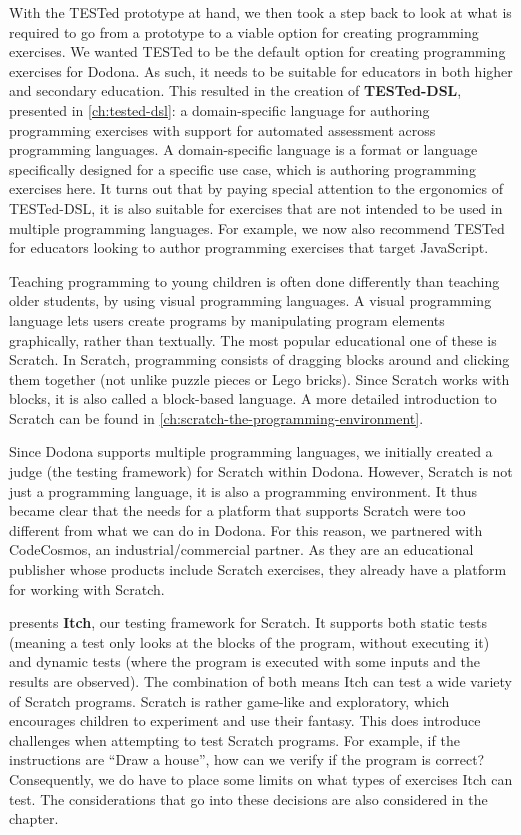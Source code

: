 \documentclass[main]{subfiles}
\begin{document}
With the TESTed prototype at hand, we then took a step back to look at what is required to go from a prototype to a viable option for creating programming exercises.
We wanted TESTed to be the default option for creating programming exercises for Dodona.
As such, it needs to be suitable for educators in both higher and secondary education.
This resulted in the creation of \textbf{TESTed-DSL}, presented in \cref{ch:tested-dsl}: a domain-specific language for authoring programming exercises with support for automated assessment across programming languages.
A domain-specific language is a format or language specifically designed for a specific use case, which is authoring programming exercises here.
It turns out that by paying special attention to the ergonomics of TESTed-DSL, it is also suitable for exercises that are not intended to be used in multiple programming languages.
For example, we now also recommend TESTed for educators looking to author programming exercises that target JavaScript.

Teaching programming to young children is often done differently than teaching older students, by using visual programming languages.
A visual programming language lets users create programs by manipulating program elements graphically, rather than textually.
The most popular educational one of these is Scratch.
In Scratch, programming consists of dragging blocks around and clicking them together (not unlike puzzle pieces or Lego bricks).
Since Scratch works with blocks, it is also called a block-based language.
A more detailed introduction to Scratch can be found in \cref{ch:scratch-the-programming-environment}.

Since Dodona supports multiple programming languages, we initially created a judge (the testing framework) for Scratch within Dodona.
However, Scratch is not just a programming language, it is also a programming environment.
It thus became clear that the needs for a platform that supports Scratch were too different from what we can do in Dodona.
For this reason, we partnered with CodeCosmos, an industrial/commercial partner.
As they are an educational publisher whose products include Scratch exercises, they already have a platform for working with Scratch.

 presents \textbf{Itch}, our testing framework for Scratch.
It supports both static tests (meaning a test only looks at the blocks of the program, without executing it) and dynamic tests (where the program is executed with some inputs and the results are observed).
The combination of both means Itch can test a wide variety of Scratch programs.
Scratch is rather game-like and exploratory, which encourages children to experiment and use their fantasy.
This does introduce challenges when attempting to test Scratch programs.
For example, if the instructions are ``Draw a house'', how can we verify if the program is correct?
Consequently, we do have to place some limits on what types of exercises Itch can test.
The considerations that go into these decisions are also considered in the chapter.
\end{document}

